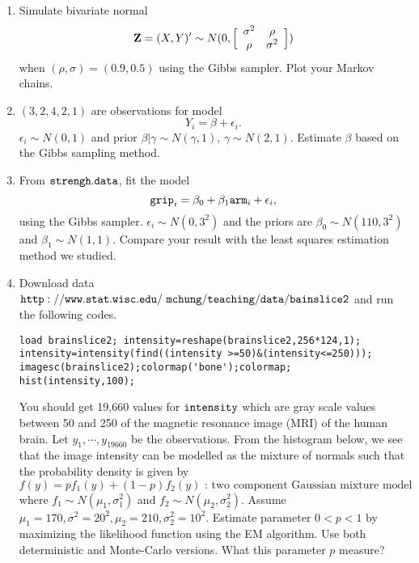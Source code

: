 \documentclass[10pt]{article} %
\begin{document}
\begin{enumerate}

\item Simulate bivariate normal
$${\bf Z} =(X,Y)' \sim N(0, \Big[\begin{array}{cc}
                                     \sigma^2 & \rho\\
                                     \rho & \sigma^2 \end{array}\Big])$$
when $(\rho,\sigma)=(0.9, 0.5)$ using the Gibbs sampler. Plot your
Markov chains.

 \item $(3,2,4,2,1)$ are observations for model
 $$Y_i = \beta + \epsilon_i.$$ $\epsilon_i \sim N(0,1)$ and prior $\beta|\gamma \sim N(\gamma,1)$, $\gamma
 \sim N(2,1)$. Estimate $\beta$ based on the Gibbs sampling
 method.


 \item From $\tt{strengh.data}$, fit the model
$${\tt grip}_i = \beta_0 + \beta_1 {\tt arm}_i + \epsilon_i,$$
using the Gibbs sampler. $\epsilon_i \sim N(0,3^2)$ and the priors
are $\beta_0 \sim N(110, 3^2)$ and $\beta_1 \sim N(1,1)$. Compare
your result with the least squares estimation method we studied.

\item Download data
$\tt{http://www.stat.wisc.edu/~mchung/teaching/data/bainslice2}$
and run the following codes.
\begin{verbatim}
load brainslice2; intensity=reshape(brainslice2,256*124,1);
intensity=intensity(find((intensity >=50)&(intensity<=250)));
imagesc(brainslice2);colormap('bone');colormap;
hist(intensity,100);
\end{verbatim}
You should get 19,660 values for $\tt{intensity}$ which are gray
scale values between 50 and 250 of the magnetic resonance image
(MRI) of the human brain. Let $y_1,\cdots ,y_{19660}$ be the
observations. From the histogram below, we see that the image
intensity can be modelled as the mixture of normals such that the
probability density is given by
$$f(y) = p f_1(y) + (1-p)f_2(y) \mbox{   : two component Gaussian mixture model}$$
where $f_1 \sim N(\mu_1,\sigma_1^2)$ and $f_2 \sim
N(\mu_2,\sigma_2^2)$. Assume $\mu_1=170,\sigma^2=20^2, \mu_2=210,
\sigma_2^2=10^2$. Estimate parameter $0<p<1$ by maximizing the
likelihood function using the EM algorithm. Use both deterministic
and Monte-Carlo versions.  What this parameter $p$ measure?
\end{enumerate}
\end{document}
